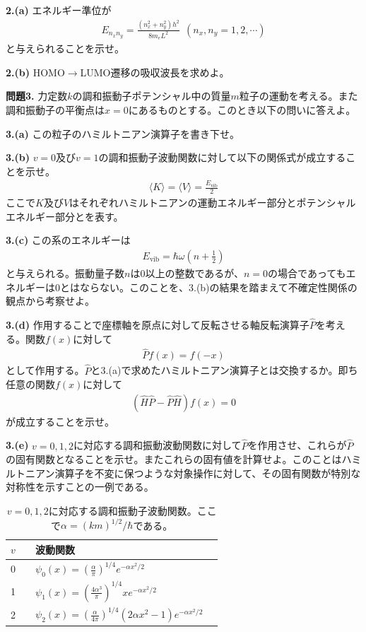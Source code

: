 \documentclass[12pt,pra,aps]{revtex4}
\begin{document}
\noindent
{\bf 2.(a)} エネルギー準位が
\begin{align}
  E_{n_x n_y} = \frac{(n_x^2+n_y^2)h^2}{8m_eL^2}\ \ (n_x,n_y=1,2,\cdots)
\end{align}
と与えられることを示せ。

\noindent
{\bf 2.(b)} HOMO$\rightarrow$LUMO遷移の吸収波長を求めよ。

\vspace{2cm}
\noindent
{\bf 問題3.} 力定数$k$の調和振動子ポテンシャル中の質量$m$粒子の運動を考える。また調和振動子の平衡点は$x=0$にあるものとする。このとき以下の問いに答えよ。

\noindent
{\bf 3.(a)} この粒子のハミルトニアン演算子を書き下せ。

\noindent
{\bf 3.(b)} $v=0$及び$v=1$の調和振動子波動関数に対して以下の関係式が成立することを示せ。
%
\begin{align}
  \langle K\rangle=\langle V\rangle=\frac{E_\text{vib}}{2}
\end{align}
%
ここで$K$及び$V$はそれぞれハミルトニアンの運動エネルギー部分とポテンシャルエネルギー部分とを表す。

\noindent
{\bf 3.(c)} この系のエネルギーは
%    
\begin{align}
  E_\text{vib}=\hbar \omega\left(n+\frac{1}{2}\right)
\end{align}
%
と与えられる。振動量子数$n$は0以上の整数であるが、$n=0$の場合であってもエネルギーは0とはならない。このことを、3.(b)の結果を踏まえて不確定性関係の観点から考察せよ。

\noindent
{\bf 3.(d)} 作用することで座標軸を原点に対して反転させる軸反転演算子$\hat{P}$を考える。関数$f(x)$に対して
\begin{align}
  \hat{P}f(x)=f(-x)
\end{align}
として作用する。$\hat{P}$と3.(a)で求めたハミルトニアン演算子とは交換するか。即ち任意の関数$f(x)$に対して
\begin{align}
  (\hat{H}\hat{P}-\hat{P}\hat{H})f(x)=0
\end{align}
が成立することを示せ。

\noindent
{\bf 3.(e)} $v=0,1,2$に対応する調和振動波動関数に対して$\hat{P}$を作用させ、これらが$\hat{P}$の固有関数となることを示せ。またこれらの固有値を計算せよ。このことはハミルトニアン演算子を不変に保つような対象操作に対して、その固有関数が特別な対称性を示すことの一例である。

\begin{table}[h]
\caption{\label{tab:chowa}
$v=0,1,2$に対応する調和振動子波動関数。ここで$\alpha=(km)^{1/2}/\hbar$である。
}
\begin{tabular}{llll}
  \hline\hline  
  $v$          && 波動関数 \\
  \hline
  0 && $\psi_0(x)=\left(\frac{\alpha}{\pi}\right)^{1/4}e^{-\alpha x^2/2}$ \\
  1 && $\psi_1(x)=\left(\frac{4\alpha^3}{\pi}\right)^{1/4}xe^{-\alpha x^2/2}$ \\
  2 && $\psi_2(x)=\left(\frac{\alpha}{4\pi}\right)^{1/4}(2\alpha x^2-1)e^{-\alpha x^2/2}$ \\
  \hline\hline  
\end{tabular}
\end{table}
\end{document}
